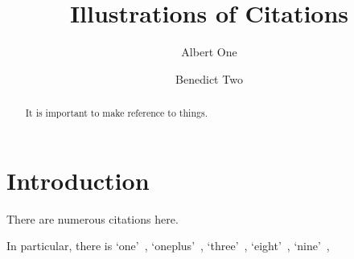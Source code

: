 \documentclass[authoryear,10pt,5p,times]{elsarticle}
\begin{document}
\begin{frontmatter}
\title{Illustrations of Citations}

\author[ao]{Albert One}
\address[ao]{A Place, Somewhere}

\author[bt]{Benedict Two}
\address[bt]{Elsewhere, On Earth}

\begin{abstract}
It is important to make reference to things.
\end{abstract}

\end{frontmatter}

\section{Introduction}

There are numerous citations here.

In particular, there is
`one'~\citep{one},
`oneplus'~\citep{oneplus},
`three'~\citep{three},
`eight'~\citep{eight},
`nine'~\citep{nine},








\end{document}
